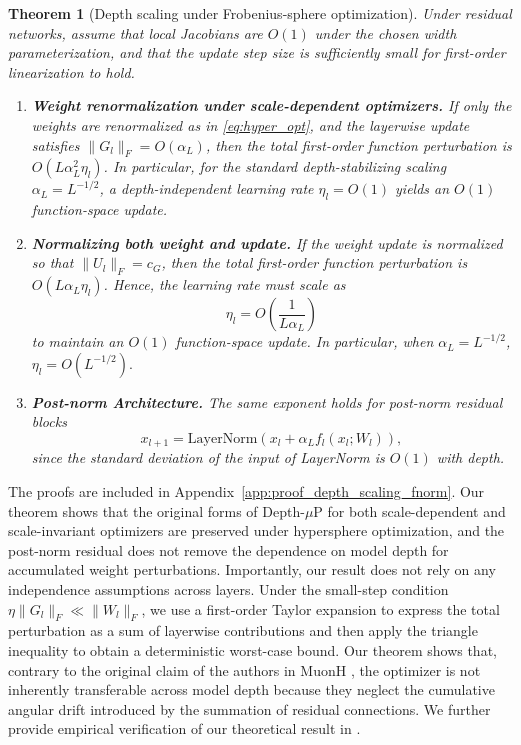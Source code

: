 \documentclass{article}
\newtheorem{theorem}{Theorem}[]
\begin{document}
\begin{theorem}[Depth scaling under Frobenius-sphere optimization]
\label{thm:depth_scaling_fnorm}
Under residual networks, assume that local Jacobians are $O(1)$ under the chosen width parameterization, and that the update step size is sufficiently small for first-order linearization to hold.
\begin{enumerate}
    \item \textbf{Weight renormalization under scale-dependent optimizers.} If only the weights are renormalized as in \eqref{eq:hyper_opt}, and the layerwise update satisfies $\|G_l\|_F = O(\alpha_L)$, then the total first-order function perturbation is $O(L\alpha_L^2 \eta_l)$. In particular, for the standard depth-stabilizing scaling $\alpha_L=L^{-1/2}$, a depth-independent learning rate $\eta_l=O(1)$ yields an $O(1)$ function-space update.

    \item \textbf{Normalizing both weight and update.} If the weight update is normalized so that $\|U_l\|_F=c_G$, then the total first-order function perturbation is $O(L\alpha_L \eta_l)$. Hence, the learning rate must scale as
    \begin{equation}
    \eta_l = O\!\left(\frac{1}{L\alpha_L}\right)
    \label{eq:main_depth_rule_short}
    \end{equation}
    to maintain an $O(1)$ function-space update. In particular, when $\alpha_L=L^{-1/2}$,
    $
    \eta_l = O(L^{-1/2}).
    $
    \item \textbf{Post-norm Architecture.} The same exponent holds for post-norm residual blocks
    \begin{equation}
    x_{l+1} = \mathrm{LayerNorm}\!\left(x_l + \alpha_L f_l(x_l;W_l)\right),
    \end{equation}
    since the standard deviation of the input of LayerNorm \cite{ba2016layer} is $O(1)$ with depth.
\end{enumerate}
\end{theorem}

The proofs are included in Appendix~\ref{app:proof_depth_scaling_fnorm}. Our theorem shows that the original forms of Depth-$\mu$P \cite{yang2023tensor} for both scale-dependent and scale-invariant optimizers are preserved under hypersphere optimization, and the post-norm residual does not remove the dependence on model depth for accumulated weight perturbations. Importantly, our result does not rely on any independence assumptions across layers. Under the small-step condition \(\eta\|G_l\|_F \ll \|W_l\|_F\), we use a first-order Taylor expansion to express the total perturbation as a sum of layerwise contributions and then apply the triangle inequality to obtain a deterministic worst-case bound. Our theorem shows that, contrary to the original claim of the authors in MuonH \cite{wen2025hyperball_part1}, the optimizer is not inherently transferable across model depth because they neglect the cumulative angular drift introduced by the summation of residual connections. We further provide empirical verification of our theoretical result in .
\end{document}
